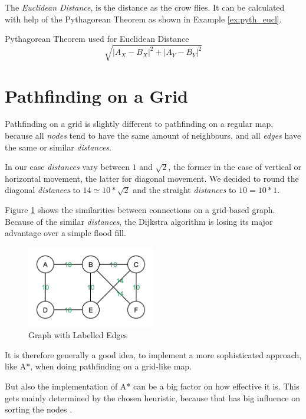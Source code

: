 The \emph{Euclidean Distance},
is the distance as the crow flies.
It can be calculated with help of the Pythagorean Theorem as shown in Example \ref{ex:pyth_eucl}.
\begin{example}{Pythagorean Theorem used for Euclidean Distance}
  \label{ex:pyth_eucl}
  \begin{equation}
	\sqrt{|A_{X}-B_{X}|^{2}+|A_{Y}-B_{Y}|^{2}}
  \end{equation}
\end{example}


\section{Pathfinding on a Grid}
Pathfinding on a grid is slightly different to pathfinding on a regular map,
because all \emph{nodes} tend to have the same amount of neighbours,
and all \emph{edges} have the same or similar \emph{distances}.

In our case \emph{distances} vary between $1$ and $\sqrt{2}$,
the former in the case of vertical or horizontal movement,
the latter for diagonal movement.
We decided to round the diagonal \emph{distances} to $14\simeq10*\sqrt{2}$ and
the straight \emph{distances} to $10=10*1$.

Figure \ref{fig:graph_cost} shows the similarities between connections on a grid-based graph.
Because of the similar \emph{distances},
the Dijkstra algorithm is losing its major advantage over a simple flood fill.
\begin{figure}[htp]
	\centering
	\includegraphics[width=0.5\textwidth]{figures/path/graph_values.pdf}
	\caption{Graph with Labelled Edges}
	\label{fig:graph_cost}
\end{figure}
%
It is therefore generally a good idea,
to implement a more sophisticated approach,
like A*,
when doing pathfinding on a grid-like map.

But also the implementation of A* can be a big factor on how effective it is.
This gets mainly determined by the chosen heuristic,
because that has big influence on sorting the nodes \cite{Sturtevant}.


